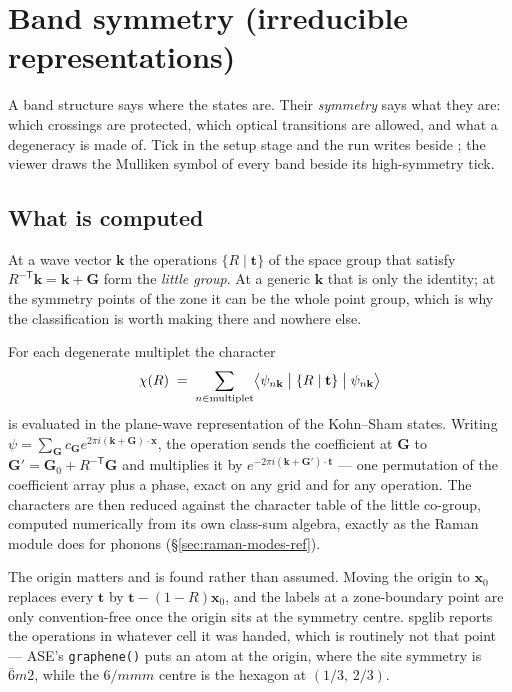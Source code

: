\section{Band symmetry (irreducible representations)}
\label{sec:band-symmetry}

A band structure says where the states are. Their \emph{symmetry} says what
they are: which crossings are protected, which optical transitions are
allowed, and what a degeneracy is made of. Tick  in the setup stage and the run
writes  beside ; the viewer draws
the Mulliken symbol of every band beside its high-symmetry tick.

\subsection{What is computed}

At a wave vector $\mathbf{k}$ the operations $\{R\mid\mathbf{t}\}$ of the space
group that satisfy $R^{-\mathsf{T}}\mathbf{k} = \mathbf{k} + \mathbf{G}$ form
the \emph{little group}. At a generic $\mathbf{k}$ that is only the identity;
at the symmetry points of the zone it can be the whole point group, which is
why the classification is worth making there and nowhere else.

For each degenerate multiplet the character
\[
  \chi(R) \;=\; \sum_{n \in \text{multiplet}}
                \bigl\langle \psi_{n\mathbf{k}} \bigm|
                \{R\mid\mathbf{t}\} \bigm| \psi_{n\mathbf{k}} \bigr\rangle
\]
is evaluated in the plane-wave representation of the Kohn--Sham states.
Writing $\psi = \sum_\mathbf{G} c_\mathbf{G}
e^{2\pi i (\mathbf{k}+\mathbf{G})\cdot\mathbf{x}}$, the operation sends the
coefficient at $\mathbf{G}$ to $\mathbf{G}' = \mathbf{G}_0 +
R^{-\mathsf{T}}\mathbf{G}$ and multiplies it by
$e^{-2\pi i (\mathbf{k}+\mathbf{G}')\cdot\mathbf{t}}$ --- one permutation of
the coefficient array plus a phase, exact on any grid and for any operation.
The characters are then reduced against the character table of the little
co-group, computed numerically from its own class-sum algebra, exactly as the
Raman module does for phonons (\S\ref{sec:raman-modes-ref}).

The origin matters and is found rather than assumed. Moving the origin to
$\mathbf{x}_0$ replaces every $\mathbf{t}$ by $\mathbf{t} - (1-R)\mathbf{x}_0$,
and the labels at a zone-boundary point are only convention-free once the
origin sits at the symmetry centre. spglib reports the operations in whatever
cell it was handed, which is routinely not that point --- ASE's
\texttt{graphene()} puts an atom at the origin, where the site symmetry is
$\bar{6}m2$, while the $6/mmm$ centre is the hexagon at $(1/3,\,2/3)$.

